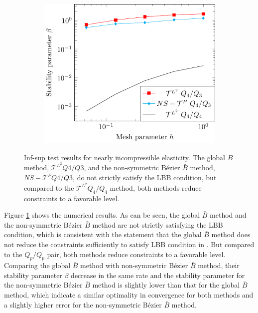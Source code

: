\documentclass{article}
\newcommand{\Bezier}{{B\'{e}zier} }
\begin{document}
\begin{figure}[htb!]
\begin{subfigure}[b]{0.31\linewidth}
    \end{subfigure}
    \begin{subfigure}[b]{0.31\linewidth}        %
        \centering
        \includegraphics[width=\linewidth]{beta_p_4}
    \end{subfigure}

    \caption{Inf-sup test results for nearly incompressible elasticity. The global $\bar{B}$ method, $\mathcal{T}^{L^2} Q4/Q3$, and the non-symmetric \Bezier $\bar{B}$ method, $NS - \mathcal{T}^P Q4/Q3$, do not strictly satisfy the LBB condition, but compared to the $\mathcal{T}^{L^2} Q_4/Q_4$ method, both methods reduce constraints to a favorable level. }
    \label{fig:inf_sup}
\end{figure}

Figure \ref{fig:inf_sup} shows the numerical results. As can be seen, the global $\bar{B}$ method and the non-symmetric \Bezier $\bar{B}$ method are not strictly satisfying the LBB condition, which is consistent with the statement that the global $\bar{B}$ method does not reduce the constraints sufficiently to satisfy LBB condition in \cite{elguedj:hal-00457010}. But compared to the $Q_p/Q_p$ pair, both methods reduce constraints to a favorable level. Comparing the global $\bar{B}$ method with non-symmetric \Bezier $\bar{B}$ method, their stability parameter $\beta$ decrease in the same rate and the stability parameter for the non-symmetric \Bezier $\bar{B}$ method is slightly lower than that for the global $\bar{B}$ method, which indicate a similar optimality in convergence for both methods and a slightly higher error for the non-symmetric \Bezier $\bar{B}$ method.
\end{document}
